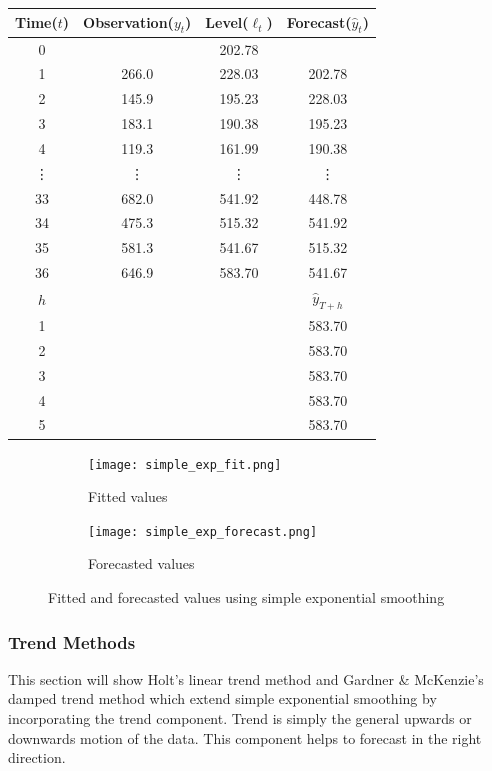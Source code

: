 \documentclass{article}
\begin{document}
  \begin{center}
    \begin{tabular}{||c c c c||} 
     \hline
     Time($t$) & Observation($y_t$) & Level($\ell_t$) & Forecast($\hat{y}_t$) \\ [0.5ex] 
     \hline
     0 &       & 202.78 &  \\ 
     \hline
     1 & 266.0 & 228.03 & 202.78 \\
     \hline
     2 & 145.9 & 195.23 & 228.03 \\
     \hline
     3 & 183.1 & 190.38 & 195.23 \\
     \hline
     4 & 119.3 & 161.99 & 190.38 \\
     \hline
     \vdots & \vdots & \vdots & \vdots \\
     \hline
     33 & 682.0 & 541.92 & 448.78 \\
     \hline
     34 & 475.3 & 515.32 & 541.92 \\
     \hline
     35 & 581.3 & 541.67 & 515.32 \\
     \hline
     36 & 646.9 & 583.70 & 541.67 \\
     \hline
     $h$ &  &  & $\hat{y}_{T+h}$ \\
     \hline
     1 &  &  & 583.70 \\
     \hline
     2 &  &  & 583.70 \\
     \hline
     3 &  &  & 583.70 \\
     \hline
     4 &  &  & 583.70 \\
     \hline
     5 &  &  & 583.70 \\
     \hline
    \end{tabular}
  \end{center}

  \begin{figure}[H]
    \centering
    \captionsetup{justification=centering}
    \begin{subfigure}[b]{0.49\linewidth}
      \texttt{[image: simple\_exp\_fit.png]}
      \caption{Fitted values}
    \end{subfigure}
    \begin{subfigure}[b]{0.49\linewidth}
      \texttt{[image: simple\_exp\_forecast.png]}
      \caption{Forecasted values}
    \end{subfigure}
    \caption{Fitted and forecasted values using simple exponential smoothing}
  \end{figure}

  \subsubsection{Trend Methods}
  This section will show Holt's linear trend method and Gardner \& McKenzie's damped trend method which extend simple exponential smoothing by incorporating the trend component. Trend is simply the general upwards or downwards motion of the data. This component helps to forecast in the right direction.
\end{document}
